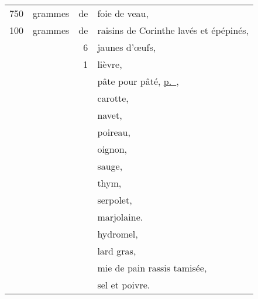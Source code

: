 \footnotesize
\begin{longtable}{rrrp{16em}}
    750 & grammes & de & foie de veau,                                                                    \\
    100 & grammes & de & raisins de Corinthe lavés et épépinés,                                           \\
        &         &  6 & jaunes d'œufs,                                                                   \\
        &         &  1 & lièvre,                                                                          \\
        &         &    & pâte pour pâté, \hyperlink{p0537}{p. \pageref{pg0537}},                          \\
        &         &    & carotte,                                                                         \\
        &         &    & navet,                                                                           \\
        &         &    & poireau,                                                                         \\
        &         &    & oignon,                                                                          \\
        &         &    & sauge,                                                                           \\
        &         &    & thym,                                                                            \\
        &         &    & serpolet,                                                                        \\
        &         &    & marjolaine.                                                                      \\
        &         &    & hydromel,                                                                        \\
        &         &    & lard gras,                                                                       \\
        &         &    & mie de pain rassis tamisée,                                                      \\
        &         &    & sel et poivre.                                                                   \\
\end{longtable}
\normalsize

